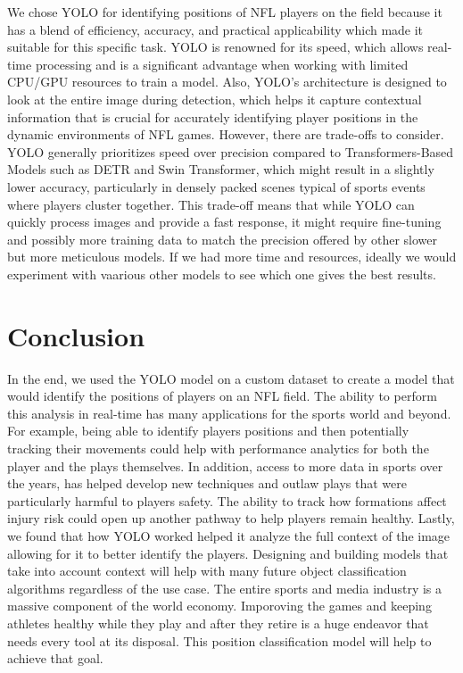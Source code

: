 We chose YOLO for identifying positions of NFL players on the field because it has a blend of efficiency, accuracy, and practical applicability which made it suitable for this specific task. YOLO is renowned for its speed, which allows real-time processing and is a significant advantage when working with limited CPU/GPU resources to train a model.
 Also, YOLO's architecture is designed to look at the entire image during detection, which helps it capture contextual information that is crucial for accurately identifying player positions in the dynamic environments of NFL games.
 However, there are trade-offs to consider. YOLO generally prioritizes speed over precision compared to Transformers-Based Models such as DETR and Swin Transformer, which might result in a slightly lower accuracy, particularly in densely packed scenes typical of sports events where players cluster together. This trade-off means that while YOLO can quickly process images and provide a fast response, it might require fine-tuning and possibly more training data to match the precision offered by other slower but more meticulous models.
 If we had more time and resources, ideally we would experiment with vaarious other models to see which one gives the best results.


\section{Conclusion}

In the end, we used the YOLO model on a custom dataset to create a model that would identify the positions of players on an NFL field. The ability to perform this analysis in real-time has many applications for the sports world and beyond. For example, being able to identify players positions and then potentially tracking their movements could help with performance analytics for both the player and the plays themselves. In addition, access to more data in sports over the years, has helped develop new techniques and outlaw plays that were particularly harmful to players safety. The ability to track how formations affect injury risk could open up another pathway to help players remain healthy. Lastly, we found that how YOLO worked helped it analyze the full context of the image allowing for it to better identify the players. Designing and building models that take into account context will help with many future object classification algorithms regardless of the use case. The entire sports and media industry is a massive component of the world economy. Imporoving the games and keeping athletes healthy while they play and after they retire is a huge endeavor that needs every tool at its disposal. This position classification model will help to achieve that goal.
{\small


}

